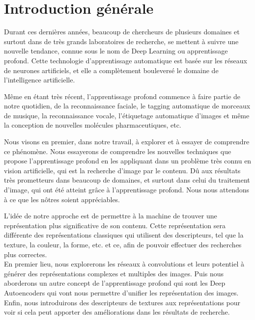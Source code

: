 
\chapter*{Introduction générale} %

	Durant ces dernières années, beaucoup de chercheurs de plusieurs domaines et surtout dans de très grands laboratoires de recherche, se mettent à suivre une nouvelle tendance, connue sous le nom de Deep Learning ou apprentissage profond. Cette technologie d'apprentissage automatique est basée sur les réseaux de neurones artificiels, et elle a complètement bouleversé le domaine de l'intelligence artificielle.
	
	Même en étant très récent, l'apprentissage profond commence à faire partie de notre quotidien, de la reconnaissance faciale, le tagging automatique de morceaux de musique, la reconnaissance vocale, l'étiquetage automatique d’images et même la conception de nouvelles molécules pharmaceutiques, etc.

	Nous visons en premier, dans notre travail, à explorer et à essayer de comprendre ce phénomène. Nous essayerons de comprendre les nouvelles techniques que propose l'apprentissage profond en les appliquant dans un problème très connu en vision artificielle, qui est la recherche d'image par le contenu. Dû aux résultats très prometteurs dans beaucoup de domaines, et surtout dans celui du traitement d'image, qui ont été atteint grâce à l'apprentissage profond. Nous nous attendons à ce que les nôtres soient appréciables.
	
	L’idée de notre approche est de permettre à la machine de trouver une représentation plus significative de son contenu. Cette représentation sera différente des représentations classiques qui utilisent des descripteurs, tel que la texture, la couleur, la forme, etc. et ce, afin de pouvoir effectuer des recherches plus correctes.\\

	En premier lieu, nous explorerons les réseaux à convolutions et leurs potentiel à générer des représentations complexes et multiples des images. Puis nous aborderons un autre concept de l'apprentissage profond qui sont les Deep Autoencoders qui vont nous permettre d'unifier les représentation des images. Enfin, nous introduirons des descripteurs de textures aux représentations pour voir si cela peut apporter des améliorations dans les résultats de recherche.\\

